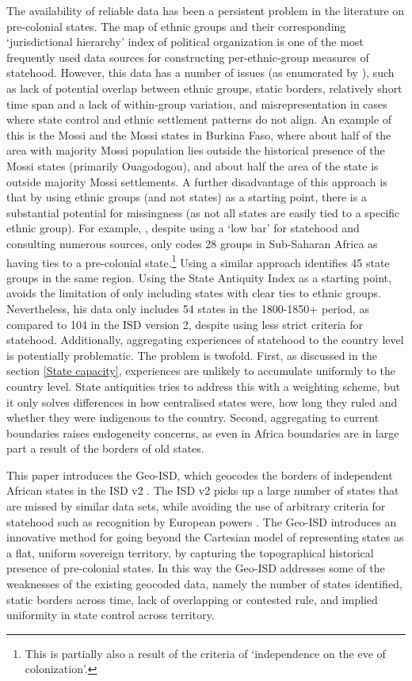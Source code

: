 \documentclass[12pt]{article}
\begin{document}
The availability of reliable data has been a persistent problem in the
literature on pre-colonial states. The \citet{Murdock1967} map of ethnic groups
and their corresponding `jurisdictional hierarchy' index of political
organization is one of the most frequently used data sources for constructing
per-ethnic-group measures of statehood. However, this data has a number of
issues (as enumerated by \citet{Michalopoulos2018}), such as lack of potential
overlap between ethnic groups, static borders, relatively short time span and a
lack of within-group variation, and misrepresentation in cases where state
control and ethnic settlement patterns do not align. An example of this is the
Mossi and the Mossi states in Burkina Faso, where about half of the area with
majority Mossi population lies outside the historical presence of the Mossi
states (primarily Ouagodogou), and about half the area of the state is outside
majority Mossi settlements. A further disadvantage of this approach is that by
using ethnic groups (and not states) as a starting point, there is a substantial
potential for missingness (as not all states are easily tied to a specific
ethnic group). For example, \citet{Paine2019}, despite using a `low bar' for
statehood and consulting numerous sources, only codes 28 groups in Sub-Saharan
Africa as having ties to a pre-colonial state.\footnote{This is partially also a
result of the criteria of `independence on the eve of colonization'.} Using a
similar approach \citet{Wig2016} identifies 45 state groups in the same region.
Using the State Antiquity Index \citep{Bockstette2012} as a starting point,
\citet{Depetris-Chauvin2016} avoids the limitation of only including states with
clear ties to ethnic groups. Nevertheless, his data only includes 54 states in
the 1800-1850+ period, as compared to 104 in the ISD version 2, despite using
less strict criteria for statehood. Additionally, aggregating experiences of
statehood to the country level is potentially problematic. The problem is
twofold. First, as discussed in the section \ref{State capacity}, experiences
are unlikely to accumulate uniformly to the country level. State antiquities
tries to address this with a weighting scheme, but it only solves differences in
how centralised states were, how long they ruled and whether they were
indigenous to the country. Second, aggregating to current boundaries raises
endogeneity concerns, as even in Africa boundaries are in large part a result of
the borders of old states.

This paper introduces the Geo-ISD, which geocodes the borders of independent
African states in the ISD v2 \citep{Butcher2020}. The ISD v2 picks up a large
number of states that are missed by similar data sets, while avoiding the use of
arbitrary criteria for statehood such as recognition by European powers
\citep{Butcher2020}. The Geo-ISD introduces an innovative method for going
beyond the Cartesian model of representing states as a flat, uniform sovereign
territory, by capturing the topographical historical presence of pre-colonial
states. In this way the Geo-ISD addresses some of the weaknesses of the existing
geocoded data, namely the number of states identified, static borders across
time, lack of overlapping or contested rule, and implied uniformity in state
control across territory.
\end{document}
